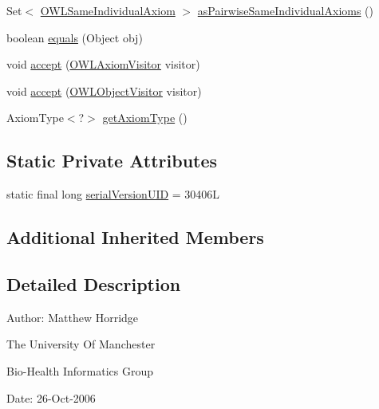 \begin{DoxyCompactItemize}
\item 
Set$<$ \hyperlink{interfaceorg_1_1semanticweb_1_1owlapi_1_1model_1_1_o_w_l_same_individual_axiom}{O\-W\-L\-Same\-Individual\-Axiom} $>$ \hyperlink{classuk_1_1ac_1_1manchester_1_1cs_1_1owl_1_1owlapi_1_1_o_w_l_same_individual_axiom_impl_a72e033bf6f9da8c0a929513c2d9e239e}{as\-Pairwise\-Same\-Individual\-Axioms} ()
\item 
boolean \hyperlink{classuk_1_1ac_1_1manchester_1_1cs_1_1owl_1_1owlapi_1_1_o_w_l_same_individual_axiom_impl_a6867dbc5d21b3b5f7faa878a77046daa}{equals} (Object obj)
\item 
void \hyperlink{classuk_1_1ac_1_1manchester_1_1cs_1_1owl_1_1owlapi_1_1_o_w_l_same_individual_axiom_impl_a2115718c319dcf55715b33ec9399abc5}{accept} (\hyperlink{interfaceorg_1_1semanticweb_1_1owlapi_1_1model_1_1_o_w_l_axiom_visitor}{O\-W\-L\-Axiom\-Visitor} visitor)
\item 
void \hyperlink{classuk_1_1ac_1_1manchester_1_1cs_1_1owl_1_1owlapi_1_1_o_w_l_same_individual_axiom_impl_a50f1f22abf1cfc0ad186fbfb9ca727c0}{accept} (\hyperlink{interfaceorg_1_1semanticweb_1_1owlapi_1_1model_1_1_o_w_l_object_visitor}{O\-W\-L\-Object\-Visitor} visitor)
\item 
Axiom\-Type$<$?$>$ \hyperlink{classuk_1_1ac_1_1manchester_1_1cs_1_1owl_1_1owlapi_1_1_o_w_l_same_individual_axiom_impl_ac044f9d89721ba37ccd174391705019b}{get\-Axiom\-Type} ()
\end{DoxyCompactItemize}
\subsection*{Static Private Attributes}
\begin{DoxyCompactItemize}
\item 
static final long \hyperlink{classuk_1_1ac_1_1manchester_1_1cs_1_1owl_1_1owlapi_1_1_o_w_l_same_individual_axiom_impl_ad61ff4f3c1a6003f96a44c80a712fcd1}{serial\-Version\-U\-I\-D} = 30406\-L
\end{DoxyCompactItemize}
\subsection*{Additional Inherited Members}


\subsection{Detailed Description}
Author\-: Matthew Horridge\par
 The University Of Manchester\par
 Bio-\/\-Health Informatics Group\par
 Date\-: 26-\/\-Oct-\/2006\par
\par
 

